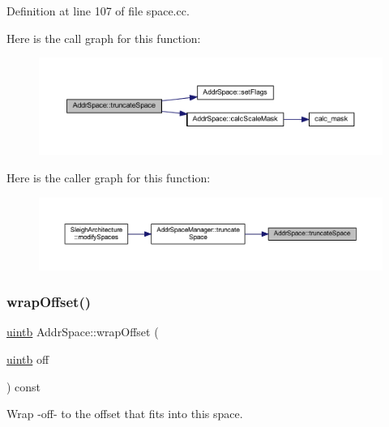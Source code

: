 Definition at line 107 of file space.\+cc.

Here is the call graph for this function\+:
\nopagebreak
\begin{figure}[H]
\begin{center}
\leavevmode
\includegraphics[width=350pt]{class_addr_space_a84ecacea771a34c4349d1f31272316c7_cgraph}
\end{center}
\end{figure}
Here is the caller graph for this function\+:
\nopagebreak
\begin{figure}[H]
\begin{center}
\leavevmode
\includegraphics[width=350pt]{class_addr_space_a84ecacea771a34c4349d1f31272316c7_icgraph}
\end{center}
\end{figure}
\mbox{\label{class_addr_space_aaf923ed847e9804b55ffa12a51202712}} 
\subsubsection{\texorpdfstring{wrapOffset()}{wrapOffset()}}
{\footnotesize\ttfamily \mbox{\hyperlink{types_8h_a2db313c5d32a12b01d26ac9b3bca178f}{uintb}} Addr\+Space\+::wrap\+Offset (\begin{DoxyParamCaption}\item[{\mbox{\hyperlink{types_8h_a2db313c5d32a12b01d26ac9b3bca178f}{uintb}}}]{off }\end{DoxyParamCaption}) const\hspace{0.3cm}{\ttfamily [inline]}}



Wrap -\/off-\/ to the offset that fits into this space. 

